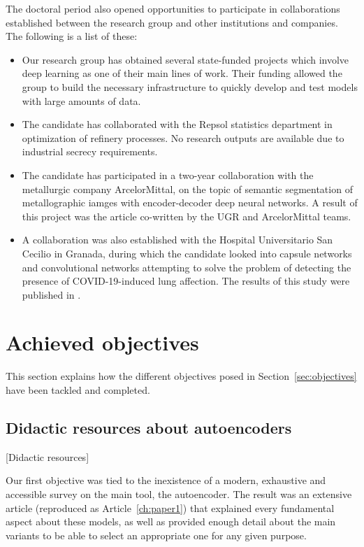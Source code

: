 The doctoral period also opened opportunities to participate in  collaborations established between the research group and other institutions and companies. The following is a list of these:

\begin{itemize}
    \item Our research group has obtained several state-funded projects which involve deep learning as one of their main lines of work. Their funding allowed the group to build the necessary infrastructure to quickly develop and test models with large amounts of data.
    \item The candidate has collaborated with the Repsol statistics department in optimization of refinery processes. No research outputs are available due to industrial secrecy requirements.
    \item The candidate has participated in a two-year collaboration with the metallurgic company ArcelorMittal, on the topic of semantic segmentation of metallographic iamges with encoder-decoder deep neural networks. A result of this project was the article  co-written by the UGR and ArcelorMittal teams.
    \item A collaboration was also established with the Hospital Universitario San Cecilio in Granada, during which the candidate looked into capsule networks and convolutional networks attempting to solve the problem of detecting the presence of COVID-19-induced lung affection. The results of this study were published in .
\end{itemize}

\section{Achieved objectives}

This section explains how the different objectives posed in Section~\ref{sec:objectives} have been tackled and completed.

\subsection{Didactic resources about autoencoders}[Didactic resources]

Our first objective was tied to the inexistence of a modern, exhaustive and accessible survey on the main tool, the autoencoder. The result was an extensive article (reproduced as Article~\ref{ch:paper1}) that explained every fundamental aspect about these models, as well as provided enough detail about the main variants to be able to select an appropriate one for any given purpose. 

